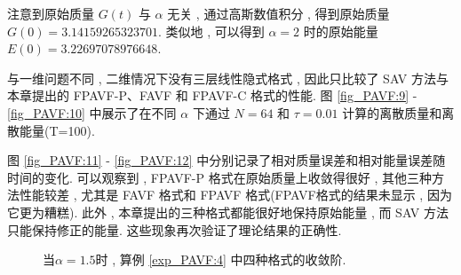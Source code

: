 		注意到原始质量 $G(t)$ 与 $\alpha$ 无关 , 通过高斯数值积分 , 得到原始质量 $G(0)=3.14159265323701$.
	类似地 , 可以得到 $\alpha=2$ 时的原始能量 $E(0)=3.22697078976648$.

	与一维问题不同 , 二维情况下没有三层线性隐式格式 , 因此只比较了 SAV 方法与本章提出的 FPAVF-P、FAVF 和 FPAVF-C 格式的性能.
	图 \ref{fig_PAVF:9} - \ref{fig_PAVF:10} 中展示了在不同 $\alpha$ 下通过 $N=64$ 和 $\tau=0.01$ 计算的离散质量和离散能量(T=100).

	图 \ref{fig_PAVF:11} - \ref{fig_PAVF:12} 中分别记录了相对质量误差和相对能量误差随时间的变化.
	可以观察到 , FPAVF-P 格式在原始质量上收敛得很好 , 其他三种方法性能较差 , 尤其是 FAVF 格式和 FPAVF 格式(FPAVF格式的结果未显示 , 因为它更为糟糕).
	此外 , 本章提出的三种格式都能很好地保持原始能量 , 而 SAV 方法只能保持修正的能量.
	这些现象再次验证了理论结果的正确性.
	
\begin{figure}[H]
	\begin{center}
	\caption{当$\alpha=1.5$时 , 算例 \ref{exp_PAVF:4}  中四种格式的收敛阶.}
	\label{fig_PAVF:7}
	\end{center}
	\end{figure}

